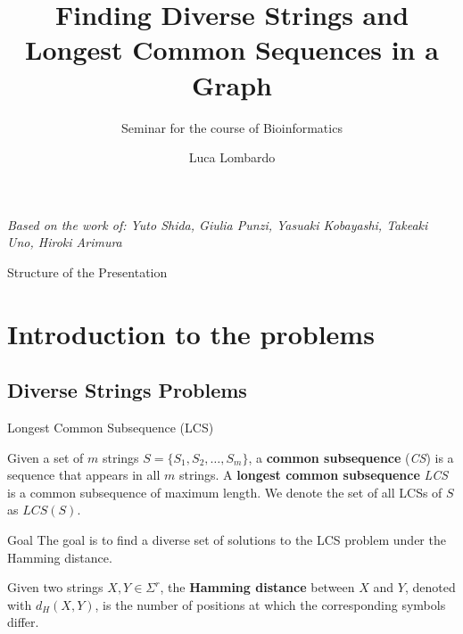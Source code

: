 \documentclass{beamer}
\title{Finding Diverse Strings and Longest Common Sequences in a Graph}
\subtitle{Seminar for the course of Bioinformatics}
\author{Luca Lombardo}
\date{}
\begin{document}
\begin{frame}[plain]
    \titlepage
    \begin{center}
        \footnotesize{\textit{Based on the work of: Yuto Shida, Giulia Punzi, Yasuaki Kobayashi, Takeaki Uno, Hiroki Arimura}}
    \end{center}
\end{frame}







\begin{frame}{Structure of the Presentation}
    \tableofcontents
\end{frame}

\section{Introduction to the problems}
\subsection{Diverse Strings Problems}
\begin{frame}{Longest Common Subsequence (LCS)}
    \begin{definition}
        Given a set of $m$ strings $S = \{ S_1, S_2, \ldots, S_m \}$, a \textbf{common subsequence} (\emph{CS}) is a sequence that appears in all $m$ strings. A \textbf{longest common subsequence} \emph{LCS} is a common subsequence of maximum length. We denote the set of all LCSs of $S$ as $LCS(S)$.
    \end{definition}
    \begin{alertblock}{Goal}
        The goal is to find a diverse set of solutions to the LCS problem under the Hamming distance.
    \end{alertblock}
    \begin{definition}
        Given two strings $X, Y \in \Sigma^r$, the \textbf{Hamming distance} between $X$ and $Y$, denoted with $d_H(X,Y)$, is the number of positions at which the corresponding symbols differ.
    \end{definition}
\end{frame}
\end{document}
